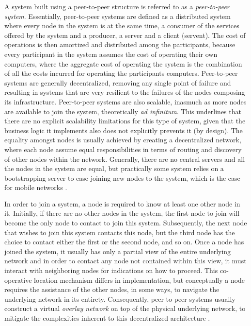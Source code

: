 \documentclass[12pt, titlepage]{uo_temp}
\begin{document}
     A system built using a peer-to-peer structure is referred to as a \emph{peer-to-peer
       system}. Essentially, peer-to-peer systems are defined as a distributed system
     where every node in the system is at the same time, a consumer of the services
     offered by the system and a producer, a server and a client (servent). The cost of
     operations is then amortized and distributed among the participants, because every
     participant in the system assumes the cost of operating their own computers, where
     the aggregate cost of operating the system is the combination of all the costs
     incurred for operating the participants computers. Peer-to-peer systems are generally
     decentralized, removing any single point of failure and resulting in systems that are
     very resilient to the failures of the nodes composing its
     infrastructure. Peer-to-peer systems are also scalable, inasmuch as more nodes are
     available to join the system, theoretically \emph{ad infinitum}. This underlines that
     there are no explicit scalability limitations for this type of system, given that the
     business logic it implements also does not explicitly prevents it (by design).
     The equality amongst nodes is usually achieved by creating a decentralized network,
     where each node assume equal responsibilities in terms of routing and discovery of
     other nodes within the network. Generally, there are no central servers and all the
     nodes in the system are equal, but practically some system relies on a bootstrapping
     server to ease joining new nodes to the system, which is the case for mobile networks
     \cite{olkkonen2006generic}.

     In order to join a system, a node is required to know at least one other node in
     it. Initially, if there are no other nodes in the system, the first node to join will
     become the only node to contact to join this system. Subsequently, the next node that
     wishes to join this system contacts this node, but the third node has the choice to
     contact either the first or the second node, and so on.
     Once a node has joined the system, it usually has only a partial view of the entire
     underlying network and in order to contact any node not contained within this view,
     it must interact with neighboring nodes for indications on how to proceed.  This
     co-operative location mechanism differs in implementation, but conceptually a node
     requires the assistance of the other nodes, in some ways, to navigate the underlying
     network in its entirety. Consequently, peer-to-peer systems usually construct
     a virtual \emph{overlay network} on top of the physical underlying network, to mitigate
     the complexities inherent to this decentralized architecture \cite{milojicic2002peer}
     \cite{barkai2001peer}.
\end{document}
